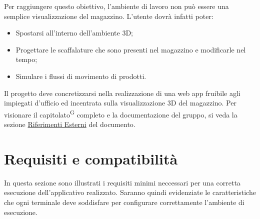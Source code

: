     Per raggiungere questo obiettivo, l'ambiente di lavoro non può essere una semplice visualizzazione del magazzino. L'utente dovrà infatti poter:
    \begin{itemize}
        \item Spostarsi all'interno dell'ambiente 3D;
        \item Progettare le scaffalature che sono presenti nel magazzino e modificarle nel tempo;
        \item Simulare i flussi di movimento di prodotti.
    \end{itemize}

    Il progetto deve concretizzarsi nella realizzazione di una web app fruibile agli impiegati d'ufficio ed incentrata sulla visualizzazione 3D del magazzino.
    Per visionare il capitolato\textsuperscript{G} completo e la documentazione del gruppo, si veda la sezione \hyperref[sec:riferimenti_esterni]{Riferimenti Esterni} 
    del documento.

\newpage


\section{Requisiti e compatibilità}\label{sec:requisiti_e_compatibilità}
    In questa sezione sono illustrati i requisiti minimi neccessari per una corretta esecuzione dell'applicativo realizzato. Saranno quindi evidenziate le caratteristiche 
    che ogni terminale deve soddisfare per configurare correttamente l'ambiente di esecuzione.

